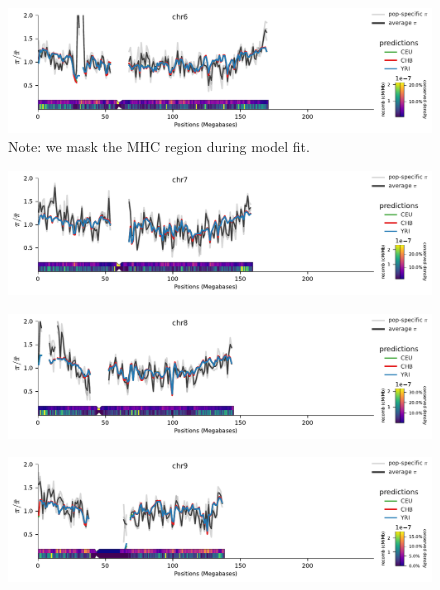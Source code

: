 \documentclass[11pt]{article}
\begin{document}
\begin{figure}[!htb]
  \centering
  \includegraphics[width=\textwidth]{figures/supplementary/pred_plot_chr6.pdf}
  \caption{Note: we mask the MHC region during model fit.}
  \label{suppfig:fit-chr6}
\end{figure}


\begin{figure}[!htb]
  \centering
  \includegraphics[width=\textwidth]{figures/supplementary/pred_plot_chr7.pdf}
  \label{suppfig:fit-chr7}
\end{figure}


\begin{figure}[!htb]
  \centering
  \includegraphics[width=\textwidth]{figures/supplementary/pred_plot_chr8.pdf}
  \label{suppfig:fit-chr8}
\end{figure}


\begin{figure}[!htb]
  \centering
  \includegraphics[width=\textwidth]{figures/supplementary/pred_plot_chr9.pdf}
  \label{suppfig:fit-chr9}
\end{figure}
\end{document}
